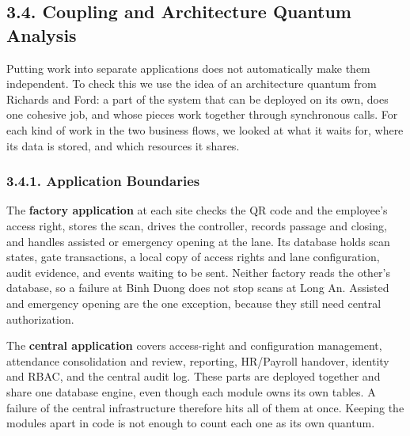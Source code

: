 \subsection*{3.4. Coupling and Architecture Quantum Analysis}

{}

Putting work into separate applications does not automatically make them independent. To check this we use the idea of an architecture quantum from Richards and Ford: a part of the system that can be deployed on its own, does one cohesive job, and whose pieces work together through synchronous calls. For each kind of work in the two business flows, we looked at what it waits for, where its data is stored, and which resources it shares.

\subsubsection*{3.4.1. Application Boundaries}

{}


The \textbf{factory application} at each site checks the QR code and the employee's access right, stores the scan, drives the controller, records passage and closing, and handles assisted or emergency opening at the lane. Its database holds scan states, gate transactions, a local copy of access rights and lane configuration, audit evidence, and events waiting to be sent. Neither factory reads the other's database, so a failure at Binh Duong does not stop scans at Long An. Assisted and emergency opening are the one exception, because they still need central authorization.

The \textbf{central application} covers access-right and configuration management, attendance consolidation and review, reporting, HR/Payroll handover, identity and RBAC, and the central audit log. These parts are deployed together and share one database engine, even though each module owns its own tables. A failure of the central infrastructure therefore hits all of them at once. Keeping the modules apart in code is not enough to count each one as its own quantum.

